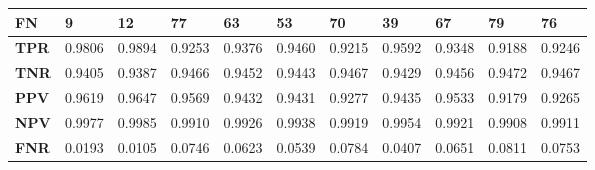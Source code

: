 \documentclass[a4paper]{article}
\begin{document}
\begin{table}[H]
\begin{tabular}{|l|l|l|l|l|l|l|l|l|l|l|}
        \multicolumn{1}{|l|}{\textbf{FN}}  & 9                              & 12                             & 77                             & 63                             & 53                             & 70                             & 39                             & 67                             & 79                             & 76                             \\ \hline
        \multicolumn{1}{|l|}{\textbf{TPR}} & \cellcolor[HTML]{9AFF99}0.9806 & \cellcolor[HTML]{9AFF99}0.9894 & \cellcolor[HTML]{9AFF99}0.9253 & \cellcolor[HTML]{9AFF99}0.9376 & \cellcolor[HTML]{9AFF99}0.9460 & \cellcolor[HTML]{9AFF99}0.9215 & \cellcolor[HTML]{9AFF99}0.9592 & \cellcolor[HTML]{9AFF99}0.9348 & \cellcolor[HTML]{9AFF99}0.9188 & \cellcolor[HTML]{9AFF99}0.9246 \\ \hline
        \multicolumn{1}{|l|}{\textbf{TNR}} & \cellcolor[HTML]{FFFFFF}0.9405 & \cellcolor[HTML]{FFFFFF}0.9387 & \cellcolor[HTML]{FFFFFF}0.9466 & \cellcolor[HTML]{FFFFFF}0.9452 & \cellcolor[HTML]{FFFFFF}0.9443 & \cellcolor[HTML]{FFFFFF}0.9467 & \cellcolor[HTML]{FFFFFF}0.9429 & \cellcolor[HTML]{FFFFFF}0.9456 & \cellcolor[HTML]{FFFFFF}0.9472 & \cellcolor[HTML]{FFFFFF}0.9467 \\ \hline
        \multicolumn{1}{|l|}{\textbf{PPV}} & \cellcolor[HTML]{FFFFFF}0.9619 & \cellcolor[HTML]{FFFFFF}0.9647 & \cellcolor[HTML]{FFFFFF}0.9569 & \cellcolor[HTML]{FFFFFF}0.9432 & \cellcolor[HTML]{FFFFFF}0.9431 & \cellcolor[HTML]{FFFFFF}0.9277 & \cellcolor[HTML]{FFFFFF}0.9435 & \cellcolor[HTML]{FFFFFF}0.9533 & \cellcolor[HTML]{FFFFFF}0.9179 & \cellcolor[HTML]{FFFFFF}0.9265 \\ \hline
        \multicolumn{1}{|l|}{\textbf{NPV}} & \cellcolor[HTML]{FFFFFF}0.9977 & \cellcolor[HTML]{FFFFFF}0.9985 & \cellcolor[HTML]{FFFFFF}0.9910 & \cellcolor[HTML]{FFFFFF}0.9926 & \cellcolor[HTML]{FFFFFF}0.9938 & \cellcolor[HTML]{FFFFFF}0.9919 & \cellcolor[HTML]{FFFFFF}0.9954 & \cellcolor[HTML]{FFFFFF}0.9921 & \cellcolor[HTML]{FFFFFF}0.9908 & \cellcolor[HTML]{FFFFFF}0.9911 \\ \hline
        \multicolumn{1}{|l|}{\textbf{FNR}} & \cellcolor[HTML]{9AFF99}0.0193 & \cellcolor[HTML]{9AFF99}0.0105 & \cellcolor[HTML]{9AFF99}0.0746 & \cellcolor[HTML]{9AFF99}0.0623 & \cellcolor[HTML]{9AFF99}0.0539 & \cellcolor[HTML]{9AFF99}0.0784 & \cellcolor[HTML]{9AFF99}0.0407 & \cellcolor[HTML]{9AFF99}0.0651 & \cellcolor[HTML]{9AFF99}0.0811 & \cellcolor[HTML]{9AFF99}0.0753 \\ \hline
    \end{tabular}
\end{table}
\end{document}
